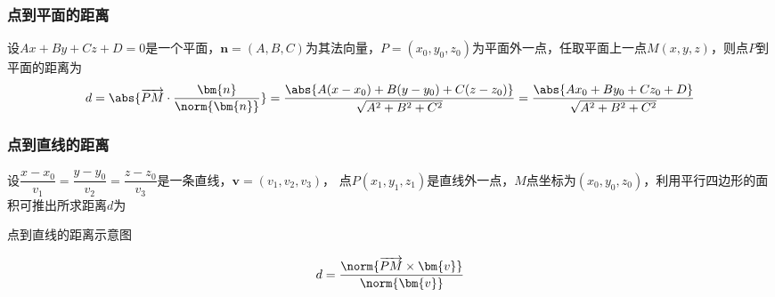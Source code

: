 \subsubsection{点到平面的距离}
设$Ax+By+Cz+D=0$是一个平面，$\bm{n}=(A,B,C)$为其法向量，$P=(x_0,y_0,z_0)$为平面外一点，任取平面上一点$M(x,y,z)$，则点$P$到平面的距离为
\begin{equation}
    \label{eq:点到平面的距离公式}
    d = \abs{\overrightarrow{PM}\cdot\frac{\bm{n}}{\norm{\bm{n}}}}
    = \frac{\abs{A(x-x_0) + B(y-y_0) + C(z-z_0)}}{\sqrt{A^2+B^2+C^2}}
    = \frac{\abs{Ax_0+By_0+Cz_0+D}}{\sqrt{A^2+B^2+C^2}}
\end{equation}

\subsubsection{点到直线的距离}
设$\dfrac{x-x_0}{v_1} = \dfrac{y-y_0}{v_2} = \dfrac{z-z_0}{v_3}$是一条直线，$\bm{v}=(v_1,v_2,v_3)$，
点$P(x_1,y_1,z_1)$是直线外一点，$M$点坐标为$(x_0,y_0,z_0)$，利用平行四边形的面积可推出所求距离$d$为
\begin{marginfigure}
    \centering
    \caption{点到直线的距离示意图}
\end{marginfigure}
\begin{equation}
    \label{eq:点到直线的距离公式}
    d = \frac{\norm{\overrightarrow{PM}\times\bm{v}}}{\norm{\bm{v}}}
\end{equation}

